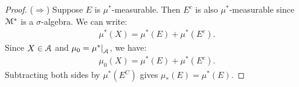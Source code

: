 \documentclass[10pt,twoside,openany]{memoir}
\begin{document}
    \begin{proof}
        ($\Rightarrow$) Suppose $E$ is $\mu^\ast$-measurable. Then $E^c$ is also $\mu^\ast$-measurable since $\mathcal{M}^\ast$ is a $\sigma$-algebra. We can write:
            \begin{equation*}
            \begin{split}
                \mu^\ast (X) = \mu^\ast(E) + \mu^\ast(E^c).
            \end{split}
            \end{equation*}
        Since $X\in \mathcal{A}$ and $\mu_0 = \restr{\mu^\ast}{\cA}$, we have:
            \begin{equation*}
            \begin{split}
                \mu_0(X) = \mu^\ast(E) + \mu^\ast(E^c).
            \end{split}
            \end{equation*}
        Subtracting both sides by $\mu^\ast(E^C)$ gives $\mu_\ast(E) = \mu^\ast(E)$. 


\end{proof}
\end{document}
